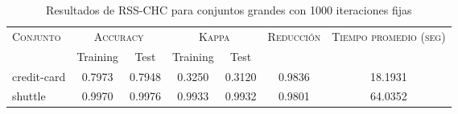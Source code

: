 \begin{table}[]
\centering
\begin{tabular}{l c c c c c c}
\hline
\multirow{2}{*}{\textsc{Conjunto}}
	& \multicolumn{2}{c}{\textsc{Accuracy}}
	& \multicolumn{2}{c}{\textsc{Kappa}}
	& \textsc{Reducción}
	& \textsc{Tiempo promedio (seg)} \\
	& Training & Test
	& Training & Test \\ 
\hline
\hline

credit-card & 0.7973 & 0.7948 & 0.3250 & 0.3120 & 0.9836 & 18.1931 \\
shuttle & 0.9970 & 0.9976 & 0.9933 & 0.9932 & 0.9801 & 64.0352 \\

\hline
\end{tabular}
\caption{Resultados de RSS-CHC para conjuntos grandes con 1000 iteraciones fijas}
\label{res-grande-RSS-CHC}
\end{table}

